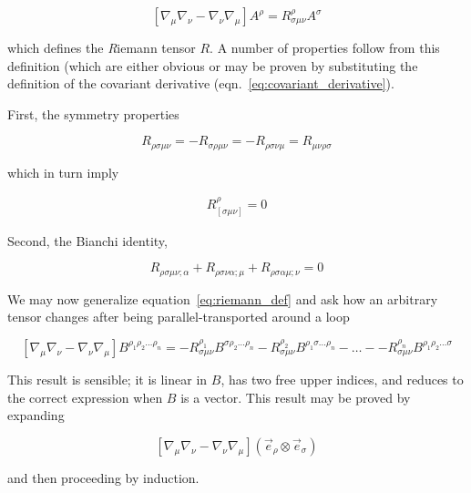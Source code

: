 \begin{equation}
\label{eq:riemann_def}
\left[\nabla_\mu \nabla_\nu - \nabla_\nu \nabla_\mu\right] A^\rho
= R^\rho_{\sigma\mu\nu} A^\sigma
\end{equation}

which defines the {\emph Riemann tensor} $R$.  A number of properties
follow from this definition (which are either obvious or may be proven
by substituting the definition of the covariant derivative
(eqn.~\ref{eq:covariant_derivative}).

First, the symmetry properties

\begin{equation}
\label{eq:symmetries}
R_{\rho\sigma\mu\nu}
= -R_{\sigma\rho\mu\nu}
= -R_{\rho\sigma\nu\mu}
= R_{\mu\nu\rho\sigma}
\end{equation}

which in turn imply

\begin{align}
R^\rho_{[\sigma\mu\nu]} = 0
\end{align}

Second, the Bianchi identity,

\begin{equation}
\label{eq:bianchi}
R_{\rho\sigma\mu\nu;\alpha}
+R_{\rho\sigma\nu\alpha;\mu}
+R_{\rho\sigma\alpha\mu;\nu} = 0
\end{equation}

We may now generalize equation~\ref{eq:riemann_def} and ask how an
arbitrary tensor changes after being parallel-transported 
around a loop

\begin{equation}
\label{eq:higher_order_riemann}
\left[\nabla_\mu \nabla_\nu - \nabla_\nu \nabla_\mu\right] 
B^{\rho_1 \rho_2 \ldots \rho_n}
= - R^{\rho_1}_{\sigma \mu\nu} B^{\sigma \rho_2 \ldots \rho_n}
- R^{\rho_2}_{\sigma \mu\nu} B^{\rho_1 \sigma \ldots \rho_n}
- \ldots -
- R^{\rho_n}_{\sigma \mu\nu} B^{\rho_1 \rho_2 \ldots \sigma }
\end{equation}

This result is sensible; it is linear in $B$, has two free upper
indices, and reduces to the correct expression when $B$ is a vector.
This result may be proved by expanding 

\begin{equation*}
\left[\nabla_\mu \nabla_\nu - \nabla_\nu \nabla_\mu\right] 
(\vec{e}_\rho \otimes \vec{e}_\sigma)
\end{equation*}

and then proceeding by induction.  

